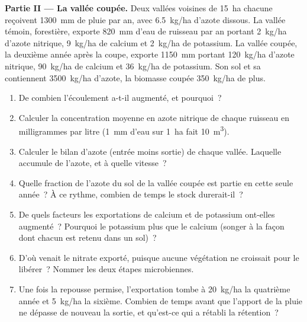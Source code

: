 \begin{problem}
\medskip
\noindent\textbf{Partie II --- La vallée coupée.}
Deux vallées voisines de \qty{15}{ha} chacune reçoivent \qty{1300}{mm}
de pluie par an, avec \qty{6.5}{kg/ha} d'azote dissous. La vallée
témoin, forestière, exporte \qty{820}{mm} d'eau de ruisseau par an
portant \qty{2}{kg/ha} d'azote nitrique, \qty{9}{kg/ha} de calcium et
\qty{2}{kg/ha} de potassium. La vallée coupée, la deuxième année après
la coupe, exporte \qty{1150}{mm} portant \qty{120}{kg/ha} d'azote
nitrique, \qty{90}{kg/ha} de calcium et \qty{36}{kg/ha} de potassium.
Son sol et sa  contiennent \qty{3500}{kg/ha} d'azote, la
biomasse coupée \qty{350}{kg/ha} de plus.
\begin{enumerate}[resume]
  \item De combien l'écoulement a-t-il augmenté, et pourquoi~?
  \item Calculer la concentration moyenne en azote nitrique de chaque
        ruisseau en milligrammes par litre (\qty{1}{mm} d'eau sur
        \qty{1}{ha} fait \qty{10}{m^3}).
  \item Calculer le bilan d'azote (entrée moins sortie) de chaque
        vallée. Laquelle accumule de l'azote, et à quelle vitesse~?
  \item Quelle fraction de l'azote du sol de la vallée coupée est
        partie en cette seule année~? À ce rythme, combien de temps le
        stock durerait-il~?
  \item De quels facteurs les exportations de calcium et de potassium
        ont-elles augmenté~? Pourquoi le potassium plus que le calcium
        (songer à la façon dont chacun est retenu dans un sol)~?
  \item D'où venait le nitrate exporté, puisque aucune végétation ne
        croissait pour le libérer~? Nommer les deux étapes microbiennes.
  \item Une fois la repousse permise, l'exportation tombe à
        \qty{20}{kg/ha} la quatrième année et \qty{5}{kg/ha} la
        sixième. Combien de temps avant que l'apport de la pluie ne
        dépasse de nouveau la sortie, et qu'est-ce qui a rétabli la
        rétention~?
\end{enumerate}


\end{problem}
